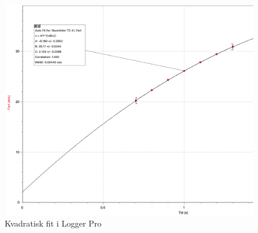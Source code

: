 \documentclass{report}
\begin{document}
\begin{figure}[h]
\begin{center}
  \includegraphics[scale=0.3]{H4_2.png}
\end{center}
\caption{Kvadratisk fit i Logger Pro}
\label{fig:2}
\end{figure}
\end{document}
